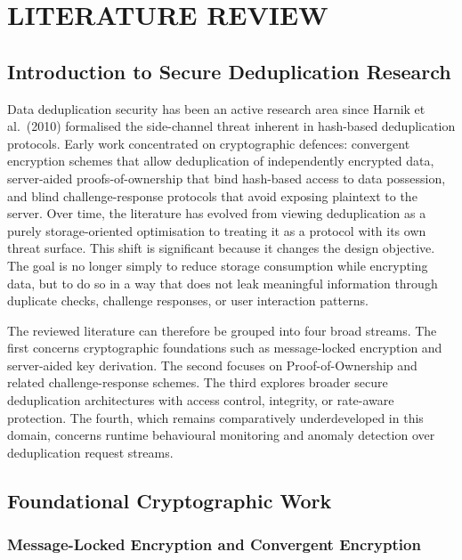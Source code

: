 \documentclass[12pt,a4paper,oneside]{report}
\begin{document}
\chapter{LITERATURE REVIEW}

\section{Introduction to Secure Deduplication Research}

Data deduplication security has been an active research area since Harnik et al.\ (2010) formalised the side-channel threat inherent in hash-based deduplication protocols.
Early work concentrated on cryptographic defences: convergent encryption schemes that allow deduplication of independently encrypted data, server-aided proofs-of-ownership that bind hash-based access to data possession, and blind challenge-response protocols that avoid exposing plaintext to the server.
Over time, the literature has evolved from viewing deduplication as a purely storage-oriented optimisation to treating it as a protocol with its own threat surface.
This shift is significant because it changes the design objective.
The goal is no longer simply to reduce storage consumption while encrypting data, but to do so in a way that does not leak meaningful information through duplicate checks, challenge responses, or user interaction patterns.

The reviewed literature can therefore be grouped into four broad streams.
The first concerns cryptographic foundations such as message-locked encryption and server-aided key derivation.
The second focuses on Proof-of-Ownership and related challenge-response schemes.
The third explores broader secure deduplication architectures with access control, integrity, or rate-aware protection.
The fourth, which remains comparatively underdeveloped in this domain, concerns runtime behavioural monitoring and anomaly detection over deduplication request streams.

\section{Foundational Cryptographic Work}

\subsection{Message-Locked Encryption and Convergent Encryption}
\end{document}
